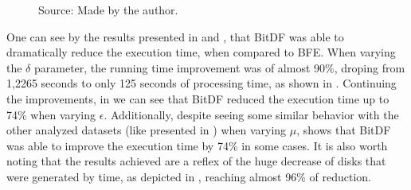 {\begin{figure}[h!]
\begin{subfigure}[t]{0.48\textwidth}
        \label{fig:tdrive_vary_g}
    \end{subfigure}
    \footnotesize{Source: Made by the author.}
    \label{fig:tdrive_results}
\end{figure}

One can see by the results presented in  and , that BitDF was
able to dramatically reduce the execution time, when compared to BFE. When varying the $\delta$ parameter, the running
time improvement was of almost 90\%, droping from 1,2265 seconds to only 125 seconds of processing time, as shown in
. Continuing the improvements, in  we can see that BitDF reduced the
execution time up to 74\% when varying $\epsilon$. Additionally, despite seeing some similar behavior with the other
analyzed datasets (like presented in ) when varying $\mu$,  shows that
BitDF was able to improve the execution time by 74\% in some cases. It is also worth noting that the results achieved
are a reflex of the huge decrease of disks that were generated by time, as depicted in ,
reaching almost 96\% of reduction.

}
